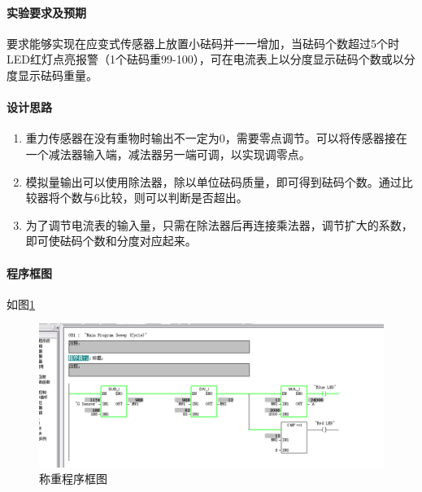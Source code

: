 \paragraph{实验要求及预期} 要求能够实现在应变式传感器上放置小砝码并一一增加，当砝码个数超过5个时LED红灯点亮报警（1个砝码重99-100），可在电流表上以分度显示砝码个数或以分度显示砝码重量。
\paragraph{设计思路}
\begin{enumerate}
\item 重力传感器在没有重物时输出不一定为0，需要零点调节。可以将传感器接在一个减法器输入端，减法器另一端可调，以实现调零点。
\item 模拟量输出可以使用除法器，除以单位砝码质量，即可得到砝码个数。通过比较器将个数与6比较，则可以判断是否超出。
\item 为了调节电流表的输入量，只需在除法器后再连接乘法器，调节扩大的系数，即可使砝码个数和分度对应起来。
\end{enumerate}
\paragraph{程序框图} 如图\ref{fig:calculate}

\begin{figure}[htbp]
\centering
\includegraphics[width=13cm]{resource/program_calculate.png}
\caption{称重程序框图}
\label{fig:calculate}
\end{figure}



